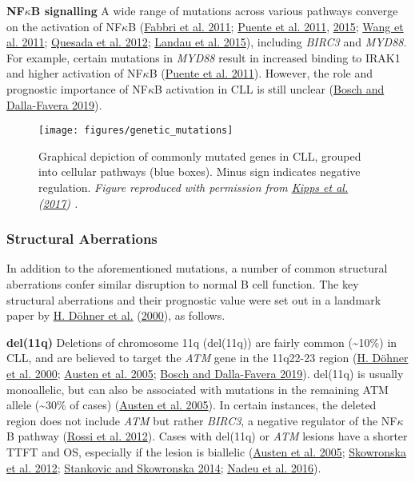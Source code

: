 \documentclass[11pt, a4paper, twosided]{book}
\begin{document}
\textbf{NF\(\kappa\)B signalling}
A wide range of mutations across various pathways converge on the activation of NF\(\kappa\)B (\protect\hyperlink{ref-Fabbri2011}{Fabbri et al. 2011}; \protect\hyperlink{ref-Puente2011}{Puente et al. 2011}, \protect\hyperlink{ref-Puente2015}{2015}; \protect\hyperlink{ref-Wang2011}{Wang et al. 2011}; \protect\hyperlink{ref-Quesada2012}{Quesada et al. 2012}; \protect\hyperlink{ref-Landau2015}{Landau et al. 2015}), including \emph{BIRC3} and \emph{MYD88}. For example, certain mutations in \emph{MYD88} result in increased binding to IRAK1 and higher activation of NF\(\kappa\)B (\protect\hyperlink{ref-Puente2011}{Puente et al. 2011}). However, the role and prognostic importance of NF\(\kappa\)B activation in CLL is still unclear (\protect\hyperlink{ref-Bosch2019}{Bosch and Dalla-Favera 2019}).


\begin{figure}

{\centering \texttt{[image: figures/genetic\_mutations]} 

}

\caption{Graphical depiction of commonly mutated genes in CLL, grouped into cellular pathways (blue boxes). Minus sign indicates negative regulation. \emph{Figure reproduced with permission from \protect\hyperlink{ref-Kipps2017}{Kipps et al.} (\protect\hyperlink{ref-Kipps2017}{2017}) .}}\label{fig:CLLmutations}
\end{figure}
\hypertarget{intro-structural-abberations}{%
\subsubsection{Structural Aberrations}\label{intro-structural-abberations}}

In addition to the aforementioned mutations, a number of common structural aberrations confer similar disruption to normal B cell function. The key structural aberrations and their prognostic value were set out in a landmark paper by \protect\hyperlink{ref-Dohner2000}{H. Döhner et al.} (\protect\hyperlink{ref-Dohner2000}{2000}), as follows.

\textbf{del(11q)}
Deletions of chromosome 11q (del(11q)) are fairly common (\textasciitilde10\%) in CLL, and are believed to target the \emph{ATM} gene in the 11q22-23 region (\protect\hyperlink{ref-Dohner2000}{H. Döhner et al. 2000}; \protect\hyperlink{ref-Austen2005}{Austen et al. 2005}; \protect\hyperlink{ref-Bosch2019}{Bosch and Dalla-Favera 2019}). del(11q) is usually monoallelic, but can also be associated with mutations in the remaining ATM allele (\textasciitilde30\% of cases) (\protect\hyperlink{ref-Austen2005}{Austen et al. 2005}). In certain instances, the deleted region does not include \emph{ATM} but rather \emph{BIRC3}, a negative regulator of the NF\(\kappa\)B pathway (\protect\hyperlink{ref-Rossi2012}{Rossi et al. 2012}). Cases with del(11q) or \emph{ATM} lesions have a shorter TTFT and OS, especially if the lesion is biallelic (\protect\hyperlink{ref-Austen2005}{Austen et al. 2005}; \protect\hyperlink{ref-Skowronska2012}{Skowronska et al. 2012}; \protect\hyperlink{ref-Stankovic2014}{Stankovic and Skowronska 2014}; \protect\hyperlink{ref-Nadeu2016}{Nadeu et al. 2016}).
\end{document}
